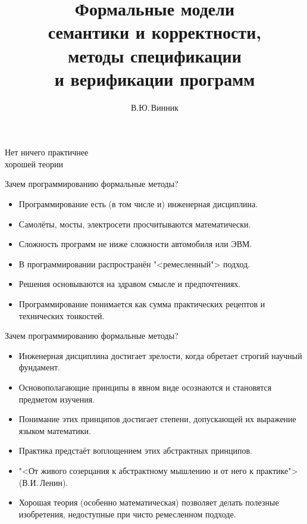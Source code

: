 \documentclass[landscape]{slides}
\begin{document}
\author{В.Ю.\,Винник}

\title{%
Формальные модели\\%
семантики и корректности,\\%
методы спецификации\\%
и верификации программ}

\date{}

\maketitle

\begin{slide}
\begin{center}
\begin{LARGE}
Нет ничего практичнее\\%
хорошей теории
\end{LARGE}
\end{center}
\end{slide}

\begin{slide}
Зачем программированию формальные методы?
\begin{itemize}
\item Программирование есть (в том числе и) инженерная дисциплина.
\item Самолёты, мосты, электросети просчитываются математически.
\item Сложность программ не ниже сложности автомобиля или ЭВМ.
\item В программировании распространён "<ремесленный"> подход.
\item Решения основываются на здравом смысле и предпочтениях.
\item Программирование понимается как сумма практических рецептов и технических тонкостей.
\end{itemize}
\end{slide}

\begin{slide}
Зачем программированию формальные методы?
\begin{itemize}
\item Инженерная дисциплина достигает зрелости, когда обретает строгий научный фундамент.
\item Основополагающие принципы в явном виде осознаются и становятся предметом изучения.
\item Понимание этих принципов достигает степени, допускающей их выражение языком математики.
\item Практика предстаёт воплощением этих абстрактных принципов.
\item "<От живого созерцания к абстрактному мышлению и от него к практике"> (В.И.\,Ленин).
\item Хорошая теория (особенно математическая) позволяет делать полезные изобретения, недоступные при чисто ремесленном подходе.
\end{itemize}
\end{slide}
\end{document}
